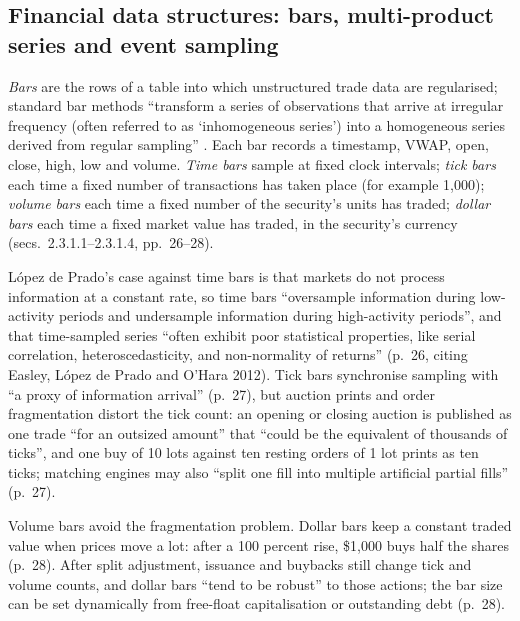 \subsection{Financial data structures: bars, multi-product series and event sampling}

\begin{qfmethod}\label{meth:activity-sampled-bars}
 \emph{Bars} are the rows of a table into which unstructured trade data are regularised; standard bar methods ``transform a series of observations that arrive at irregular frequency (often referred to as `inhomogeneous series') into a homogeneous series derived from regular sampling'' \citep[chap.~2, sec.~2.3.1, p.~26]{alpha-afml}. Each bar records a timestamp, VWAP, open, close, high, low and volume. \emph{Time bars} sample at fixed clock intervals; \emph{tick bars} each time a fixed number of transactions has taken place (for example 1,000); \emph{volume bars} each time a fixed number of the security's units has traded; \emph{dollar bars} each time a fixed market value has traded, in the security's currency (secs.~2.3.1.1--2.3.1.4, pp.~26--28).

 López de Prado's case against time bars is that markets do not process information at a constant rate, so time bars ``oversample information during low-activity periods and undersample information during high-activity periods'', and that time-sampled series ``often exhibit poor statistical properties, like serial correlation, heteroscedasticity, and non-normality of returns'' (p.~26, citing Easley, López de Prado and O'Hara 2012). Tick bars synchronise sampling with ``a proxy of information arrival'' (p.~27), but auction prints and order fragmentation distort the tick count: an opening or closing auction is published as one trade ``for an outsized amount'' that ``could be the equivalent of thousands of ticks'', and one buy of 10 lots against ten resting orders of 1 lot prints as ten ticks; matching engines may also ``split one fill into multiple artificial partial fills'' (p.~27).

Volume bars avoid the fragmentation problem. Dollar bars keep a constant traded value when prices move a lot: after a 100 percent rise, \$1{,}000 buys half the shares (p.~28). After split adjustment, issuance and buybacks still change tick and volume counts, and dollar bars ``tend to be robust'' to those actions; the bar size can be set dynamically from free-float capitalisation or outstanding debt (p.~28).


\end{qfmethod}
